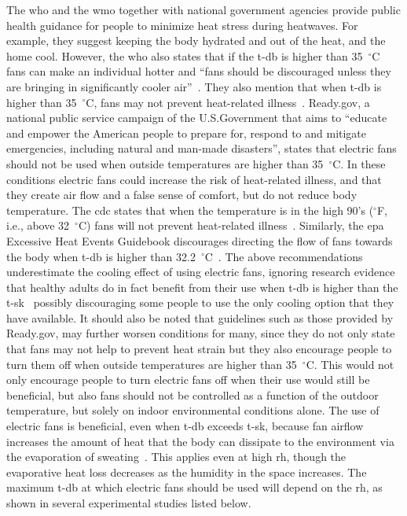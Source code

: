 The \ac{who} and the \ac{wmo} together with national government agencies provide public health guidance for people to minimize heat stress during heatwaves.
For example, they suggest keeping the body hydrated and out of the heat, and the home cool.
However, the \ac{who} also states that if the \ac{t-db} is higher than 35~$^{\circ}$C fans can make an individual hotter and ``fans should be discouraged unless they are bringing in significantly cooler air''~\cite{WMO2015}.
They also mention that when \ac{t-db} is higher than 35~$^{\circ}$C, fans may not prevent heat-related illness~\cite{HeatandH28:online}.
Ready.gov, a national public service campaign of the U.S.\@ Government that aims to ``educate and empower the American people to prepare for, respond to and mitigate emergencies, including natural and man-made disasters'', states that electric fans should not be used when outside temperatures are higher than 35~$^{\circ}$C\@.
In these conditions electric fans could increase the risk of heat-related illness, and that they create air flow and a false sense of comfort, but do not reduce body temperature.
The \ac{cdc} states that when the temperature is in the high 90's ($^{\circ}$F, i.e., above 32~$^{\circ}$C) fans will not prevent heat-related illness~\cite{ExtremeH66:online}.
Similarly, the \ac{epa} Excessive Heat Events Guidebook discourages directing the flow of fans towards the body when \ac{t-db} is higher than 32.2~$^{\circ}$C~\cite{UnitedStatesEnvironmentalProtectionAgency2006}.
The above recommendations underestimate the cooling effect of using electric fans, ignoring research evidence that healthy adults do in fact benefit from their use when \ac{t-db} is higher than the \ac{t-sk}~\cite{Rate2015, Jay2015, Jay2019a, Rate2015, Gagnon2017} possibly discouraging some people to use the only cooling option that they have available.
It should also be noted that guidelines such as those provided by Ready.gov, may further worsen conditions for many, since they do not only state that fans may not help to prevent heat strain but they also encourage people to turn them off when outside temperatures are higher than 35~$^{\circ}$C\@.
This would not only encourage people to turn electric fans off when their use would still be beneficial, but also fans should not be controlled as a function of the outdoor temperature, but solely on indoor environmental conditions alone.
The use of electric fans is beneficial, even when \ac{t-db} exceeds \ac{t-sk}, because fan airflow increases the amount of heat that the body can dissipate to the environment via the evaporation of sweating~\cite{Jay2015}.
This applies even at high \ac{rh}, though the evaporative heat loss decreases as the humidity in the space increases.
The maximum \ac{t-db} at which electric fans should be used will depend on the \ac{rh}, as shown in several experimental studies listed below.

